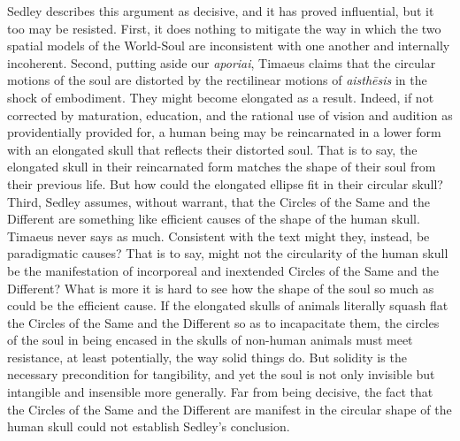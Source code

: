 Sedley describes this argument as decisive, and it has proved influential, but it too may be resisted. First, it does nothing to mitigate the way in which the two spatial models of the World-Soul are inconsistent with one another and internally incoherent. Second, putting aside our \emph{aporiai}, Timaeus claims that the circular motions of the soul are distorted by the rectilinear motions of \emph{aisthēsis} in the shock of embodiment. They might become elongated as a result. Indeed, if not corrected by maturation, education, and the rational use of vision and audition as providentially provided for, a human being may be reincarnated in a lower form with an elongated skull that reflects their distorted soul. That is to say, the elongated skull in their reincarnated form matches the shape of their soul from their previous life. But how could the elongated ellipse fit in their circular skull? Third, Sedley assumes, without warrant, that the Circles of the Same and the Different are something like efficient causes of the shape of the human skull. Timaeus never says as much. Consistent with the text might they, instead, be paradigmatic causes? That is to say, might not the circularity of the human skull be the manifestation of incorporeal and inextended Circles of the Same and the Different? What is more it is hard to see how the shape of the soul so much as could be the efficient cause. If the elongated skulls of animals literally squash flat the Circles of the Same and the Different so as to incapacitate them, the circles of the soul in being encased in the skulls of non-human animals must meet resistance, at least potentially, the way solid things do. But solidity is the necessary precondition for tangibility, and yet the soul is not only invisible but intangible and insensible more generally. Far from being decisive, the fact that the Circles of the Same and the Different are manifest in the circular shape of the human skull could not establish Sedley's conclusion.

